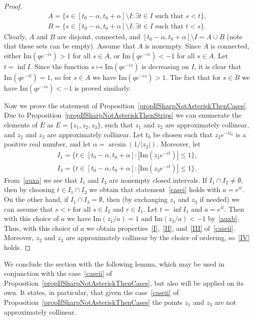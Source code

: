 \documentclass{amsart}
\numberwithin{equation}{section}
\theoremstyle{definition}
\theoremstyle{remark}
\begin{document}
\begin{proof}
\[\begin{gathered}
			A = \{s \in [t_0 - \alpha, t_0 + \alpha] \setminus I: \exists t \in I \text{ such that } s < t\}, \\ B = \{s \in [t_0 - \alpha, t_0 + \alpha] \setminus I: \exists t \in I \text{ such that } t < s\}.
		\end{gathered}
		\]
		Clearly, $A$ and $B$ are disjoint, connected, and $[t_0 -\alpha, t_0 + \alpha] \setminus I = A \cup B$ (note that these sets can be empty). Assume that $A$ is nonempty. Since $A$ is connected, either $\mathrm{Im}(qe^{-is}) > 1$ for all $s \in A$, or $\mathrm{Im}(qe^{-is}) < -1$ for all $s \in A$. Let $t = \inf I$. Since the function $s \mapsto \mathrm{Im}(qe^{-is})$ is decreasing on $I$, it is clear that $\mathrm{Im}(qe^{-it}) = 1$, so for $s \in A$ we have $\mathrm{Im}(qe^{-is}) > 1$. The fact that for $s \in B$ we have $\mathrm{Im}(qe^{-is}) < -1$ is proved similarly.
		
		Now we prove the statement of Proposition~\ref{propIfSharpNotAsteriskThenCases}. Due to Proposition~\ref{propIfSharpNotAsteriskThenStrips} we can enumerate the elements of $E$ as $E = \{z_1, z_2, z_3\}$, such that $z_1$ and $z_2$ are approximately collinear, and $z_2$ and $z_3$ are approximately collinear.  Let $t_0$ be chosen such that $z_2 e^{-it_0}$ is a positive real number, and let $\alpha = \arcsin(1/|z_2|)$. Moreover, let
		\[
		\begin{gathered}
			I_1 = \{t \in [t_0 - \alpha, t_0 + \alpha]:  |\mathrm{Im}(z_1 e^{-it})| \le 1\},\\	I_3 = \{t \in [t_0 - \alpha, t_0 + \alpha]:  |\mathrm{Im}(z_3 e^{-it})| \le 1\}.
		\end{gathered}
		\]
		From~\ref{auxa} we see that $I_1$ and $I_3$ are nonempty closed intervals. If $I_1 \cap I_2 \ne \emptyset$, then by choosing $t \in I_1 \cap I_3$ we obtain that statement~\ref{casei} holds with $a = e^{it}$. On the other hand, if $I_1 \cap I_3 = \emptyset$, then (by exchanging $z_1$ and $z_3$ if needed) we can assume that $s < r$ for all $s \in I_3$ and $r \in I_1$. Let $t = \inf I_1$ and $a = e^{it}$. Then with this choice of $a$ we have $\mathrm{Im}(z_1/a) = 1$ and $\mathrm{Im}(z_3/a) < -1$ by~\ref{auxb}. Thus, with this choice of $a$ we obtain properties~\ref{I},~\ref{II}, and~\ref{III} of~\ref{caseii}. Moreover, $z_2$ and $z_3$ are approximately collinear by the choice of ordering, so~\ref{IV} holds.
		
	\end{proof}
	
	We conclude the section with the following lemma, which may be used in conjunction with the case~\ref{caseii} of Proposition~\ref{propIfSharpNotAsteriskThenCases}, but also will be applied on its own. It states, in particular, that given the case~\ref{caseii} of Proposition~\ref{propIfSharpNotAsteriskThenCases} the points $z_1$ and $z_3$ are not approximately collinear.
	
\end{document}

